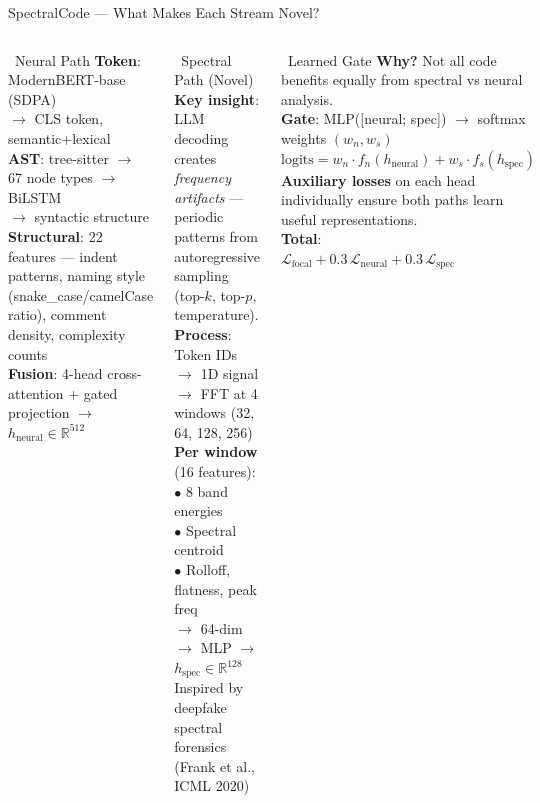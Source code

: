\documentclass[aspectratio=169, 10pt]{beamer}
\begin{document}
\begin{frame}{SpectralCode --- What Makes Each Stream Novel?}
\vspace{-0.15cm}
\begin{columns}[T]
\begin{block}{\faCode\ Neural Path}
\scriptsize
\textbf{Token}: ModernBERT-base (SDPA) \\
$\to$ CLS token, semantic+lexical \\[3pt]
\textbf{AST}: tree-sitter $\to$ 67 node types $\to$ BiLSTM \\
$\to$ syntactic structure \\[3pt]
\textbf{Structural}: 22 features --- indent patterns, naming style (snake\_case/camelCase ratio), comment density, complexity counts \\[3pt]
\textbf{Fusion}: 4-head cross-attention + gated projection $\to$ $h_{\text{neural}} \in \mathbb{R}^{512}$
\end{block}

\begin{block}{\faWaveSquare\ Spectral Path (Novel)}
\scriptsize
\textbf{Key insight}: LLM decoding creates \emph{frequency artifacts} --- periodic patterns from autoregressive sampling (top-$k$, top-$p$, temperature). \\[3pt]
\textbf{Process}: \\
Token IDs $\to$ 1D signal $\to$ FFT at 4 windows (32, 64, 128, 256) \\[3pt]
\textbf{Per window} (16 features): \\
$\bullet$ 8 band energies \\
$\bullet$ Spectral centroid \\
$\bullet$ Rolloff, flatness, peak freq \\[3pt]
$\to$ 64-dim $\to$ MLP $\to$ $h_{\text{spec}} \in \mathbb{R}^{128}$\\[3pt]
{\tiny Inspired by deepfake spectral forensics (Frank et al., ICML 2020)}
\end{block}

\begin{block}{\faBalanceScale\ Learned Gate}
\scriptsize
\textbf{Why?} Not all code benefits equally from spectral vs neural analysis. \\[3pt]
\textbf{Gate}: MLP([neural; spec]) $\to$ softmax weights $(w_n, w_s)$ \\[3pt]
$\text{logits} = w_n \cdot f_n(h_{\text{neural}}) + w_s \cdot f_s(h_{\text{spec}})$ \\[3pt]
\textbf{Auxiliary losses} on each head individually ensure both paths learn useful representations. \\[3pt]
\textbf{Total}: \\
$\mathcal{L}_{\text{focal}} + 0.3\,\mathcal{L}_{\text{neural}} + 0.3\,\mathcal{L}_{\text{spec}}$
\end{block}
\end{columns}
\end{frame}
\end{document}
